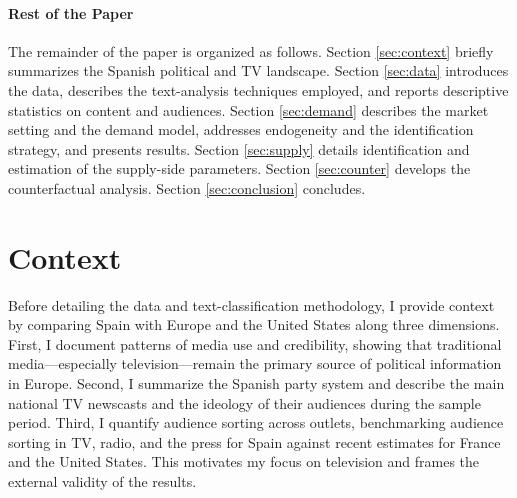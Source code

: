 \documentclass[12pt]{article}
\begin{document}

\paragraph{Rest of the Paper}

The remainder of the paper is organized as follows. Section \ref{sec:context} briefly summarizes the Spanish political and TV landscape. Section \ref{sec:data} introduces the data, describes the text-analysis techniques employed, and reports descriptive statistics on content and audiences. Section \ref{sec:demand} describes the market setting and the demand model, addresses endogeneity and the identification strategy, and presents results. Section \ref{sec:supply} details identification and estimation of the supply-side parameters. Section \ref{sec:counter} develops the counterfactual analysis. Section \ref{sec:conclusion} concludes.

	
	
	\section{Context}
	
Before detailing the data and text-classification methodology, I provide context by comparing Spain with Europe and the United States along three dimensions. First, I document patterns of media use and credibility, showing that traditional media—especially television—remain the primary source of political information in Europe. Second, I summarize the Spanish party system and describe the main national TV newscasts and the ideology of their audiences during the sample period. Third, I quantify audience sorting across outlets, benchmarking audience sorting in TV, radio, and the press for Spain against recent estimates for France and the United States. This motivates my focus on television and frames the external validity of the results.
	
\end{document}
